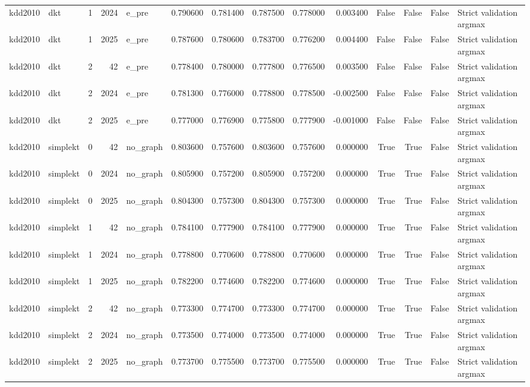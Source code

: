 \begin{tabular}{llrrlrrrrrrrrl}
kdd2010 & dkt & 1 & 2024 & e_pre & 0.790600 & 0.781400 & 0.787500 & 0.778000 & 0.003400 & False & False & False & Strict validation argmax \\
kdd2010 & dkt & 1 & 2025 & e_pre & 0.787600 & 0.780600 & 0.783700 & 0.776200 & 0.004400 & False & False & False & Strict validation argmax \\
kdd2010 & dkt & 2 & 42 & e_pre & 0.778400 & 0.780000 & 0.777800 & 0.776500 & 0.003500 & False & False & False & Strict validation argmax \\
kdd2010 & dkt & 2 & 2024 & e_pre & 0.781300 & 0.776000 & 0.778800 & 0.778500 & -0.002500 & False & False & False & Strict validation argmax \\
kdd2010 & dkt & 2 & 2025 & e_pre & 0.777000 & 0.776900 & 0.775800 & 0.777900 & -0.001000 & False & False & False & Strict validation argmax \\
kdd2010 & simplekt & 0 & 42 & no_graph & 0.803600 & 0.757600 & 0.803600 & 0.757600 & 0.000000 & True & True & False & Strict validation argmax \\
kdd2010 & simplekt & 0 & 2024 & no_graph & 0.805900 & 0.757200 & 0.805900 & 0.757200 & 0.000000 & True & True & False & Strict validation argmax \\
kdd2010 & simplekt & 0 & 2025 & no_graph & 0.804300 & 0.757300 & 0.804300 & 0.757300 & 0.000000 & True & True & False & Strict validation argmax \\
kdd2010 & simplekt & 1 & 42 & no_graph & 0.784100 & 0.777900 & 0.784100 & 0.777900 & 0.000000 & True & True & False & Strict validation argmax \\
kdd2010 & simplekt & 1 & 2024 & no_graph & 0.778800 & 0.770600 & 0.778800 & 0.770600 & 0.000000 & True & True & False & Strict validation argmax \\
kdd2010 & simplekt & 1 & 2025 & no_graph & 0.782200 & 0.774600 & 0.782200 & 0.774600 & 0.000000 & True & True & False & Strict validation argmax \\
kdd2010 & simplekt & 2 & 42 & no_graph & 0.773300 & 0.774700 & 0.773300 & 0.774700 & 0.000000 & True & True & False & Strict validation argmax \\
kdd2010 & simplekt & 2 & 2024 & no_graph & 0.773500 & 0.774000 & 0.773500 & 0.774000 & 0.000000 & True & True & False & Strict validation argmax \\
kdd2010 & simplekt & 2 & 2025 & no_graph & 0.773700 & 0.775500 & 0.773700 & 0.775500 & 0.000000 & True & True & False & Strict validation argmax \\
\bottomrule
\end{tabular}
